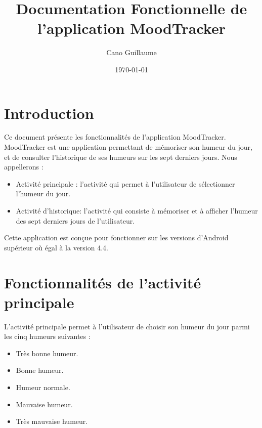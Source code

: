 \documentclass{article}[a4paper,12pt]
\title{\vfill Documentation Fonctionnelle de l'application MoodTracker}
\author{Cano Guillaume}
\date{\today\vfill}
\begin{document}
\maketitle


\newpage
\renewcommand{\contentsname}{Sommaire}
\tableofcontents
\newpage

\section{Introduction}

Ce document présente les fonctionnalités de l'application MoodTracker.
MoodTracker est une application permettant de mémoriser son humeur du jour,
et de consulter l'historique de ses humeurs sur les sept derniers jours.
Nous appellerons :

\begin{itemize}
\item Activité principale : l'activité qui permet à l'utilisateur
  de sélectionner l'humeur du jour.
\item Activité d'historique: l'activité qui consiste à mémoriser et
  à afficher l'humeur des sept derniers jours de l'utilisateur.
\end{itemize}

\medskip

Cette application est conçue pour fonctionner sur les versions d'Android
supérieur où égal à la version 4.4.

\section{Fonctionnalités de l'activité principale}

L'activité principale permet à l'utilisateur de choisir son humeur du jour parmi
les cinq humeurs suivantes :

\begin{itemize}
\item[] Très bonne humeur.
\item[] Bonne humeur.
\item[] Humeur normale.
\item[] Mauvaise humeur.
\item[] Très mauvaise humeur.
\end{itemize}
\end{document}
